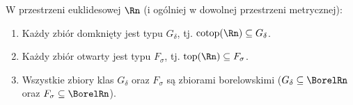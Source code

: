 \begin{wn} W przestrzeni euklidesowej $\Rn$ (i ogólniej w dowolnej przestrzeni metrycznej):
    \begin{enumerate}
        \item Każdy zbiór domknięty jest typu $G_\delta$, tj. $\mathrm{cotop}(\Rn) \subseteq  G_\delta$.
        \item Każdy zbiór otwarty jest typu $F_\sigma$, tj. $\mathrm{top}(\Rn) \subseteq  F_\sigma$.
        \item Wszystkie zbiory klas $G_\delta$ oraz $F_\sigma$ są zbiorami borelowskimi ($G_\delta \subseteq  \BorelRn$ oraz $F_\sigma \subseteq  \BorelRn$).
    \end{enumerate}
\end{wn}
